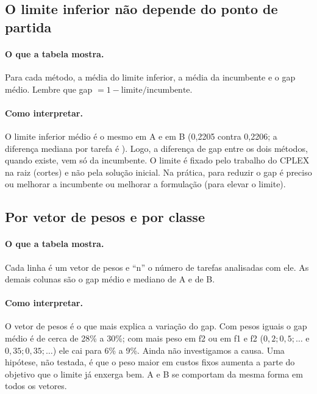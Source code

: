 \documentclass[11pt,a4paper]{article}
\begin{document}
\subsection{O limite inferior não depende do ponto de partida}

\begin{table}[H]
  \centering
  \small
  
  \caption{Limite inferior, incumbente e gap médios. O limite de A é derivado do gap
  reportado (incumbente $\times(1-\text{gap})$).}
  \label{tab:bound}
\end{table}

\paragraph{O que a tabela mostra.} Para cada método, a média do limite inferior, a
média da incumbente e o gap médio. Lembre que gap $=1-\text{limite}/\text{incumbente}$.

\paragraph{Como interpretar.} O limite inferior médio é o mesmo em A e em B (0,2205 contra
0,2206; a diferença mediana por tarefa é \boundDiffMedian{}). Logo, a diferença de gap
entre os dois métodos, quando existe, vem só da incumbente. O limite é fixado pelo
trabalho do CPLEX na raiz (cortes) e não pela solução inicial. Na prática, para reduzir o
gap é preciso ou melhorar a incumbente ou melhorar a formulação (para elevar o limite).

\subsection{Por vetor de pesos e por classe}

\begin{table}[H]
  \centering
  \scriptsize
  \resizebox{\textwidth}{!}{}
  \caption{Gap por vetor de pesos, nas tarefas analisadas.}
  \label{tab:gap-peso}
\end{table}

\paragraph{O que a tabela mostra.} Cada linha é um vetor de pesos e ``n'' o número de
tarefas analisadas com ele. As demais colunas são o gap médio e mediano de A e de B.

\paragraph{Como interpretar.} O vetor de pesos é o que mais explica a variação do gap. Com
pesos iguais o gap médio é de cerca de 28\% a 30\%; com mais peso em f2 ou em f1 e f2
($0{,}2;0{,}5;\ldots$ e $0{,}35;0{,}35;\ldots$) ele cai para 6\% a 9\%. Ainda não investigamos a
causa. Uma hipótese, não testada, é que o peso maior em custos fixos aumenta a parte do
objetivo que o limite já enxerga bem. A e B se comportam da mesma forma em todos os vetores.
\end{document}
